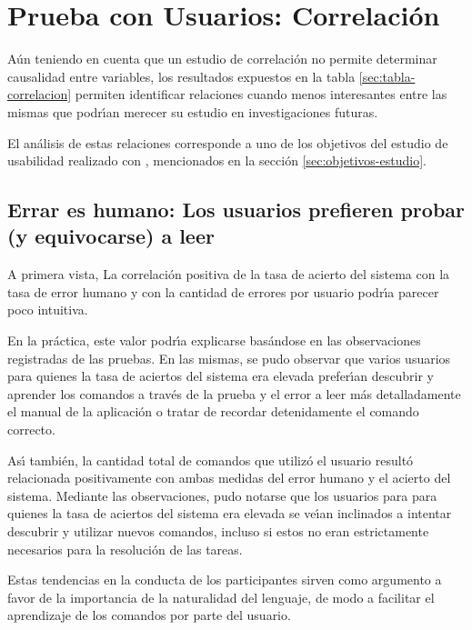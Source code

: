 \section{Prueba con Usuarios: Correlaci\'on}
A\'un teniendo en cuenta que un estudio de correlaci\'on no permite determinar causalidad
entre variables, los resultados expuestos en la tabla \ref{sec:tabla-correlacion} 
permiten identificar relaciones cuando menos interesantes entre las mismas que podr{{\'\i}}an
merecer su estudio en investigaciones futuras.

El an\'alisis de estas relaciones corresponde a uno de los objetivos del estudio de usabilidad
realizado con , mencionados en la secci\'on \ref{sec:objetivos-estudio}.

\subsection[Errar es humano: Los usuarios prefieren probar (y equivocarse) a leer]
{Errar es humano: Los usuarios prefieren probar \\ (y equivocarse) a leer}
A primera vista, La correlaci\'on positiva de la tasa de acierto del sistema con la
tasa de error humano y con la cantidad de errores por usuario podr{{\'\i}}a parecer
poco intuitiva.

En la pr\'actica, este valor podr{{\'\i}}a explicarse bas\'andose en las observaciones registradas 
de las pruebas. En las mismas, se pudo observar que varios usuarios para quienes la tasa de
aciertos del sistema era elevada prefer{{\'\i}}an descubrir y aprender los comandos a trav\'es
de la prueba y el error a leer m\'as detalladamente el manual de la aplicaci\'on o tratar de
recordar detenidamente el comando correcto.

As{{\'\i}} tambi\'en, la cantidad total de comandos que utiliz\'o el usuario result\'o relacionada
positivamente con ambas medidas del error humano y el acierto del sistema. Mediante las 
observaciones, pudo notarse que los usuarios para para quienes la tasa de
aciertos del sistema era elevada se ve{{\'\i}}an inclinados a intentar descubrir y utilizar nuevos
comandos, incluso si estos no eran estrictamente necesarios para la resoluci\'on de las tareas.

Estas tendencias en la conducta de los participantes sirven como argumento a favor de la importancia 
de la naturalidad del lenguaje, de modo a facilitar el aprendizaje de los comandos por parte del usuario.

